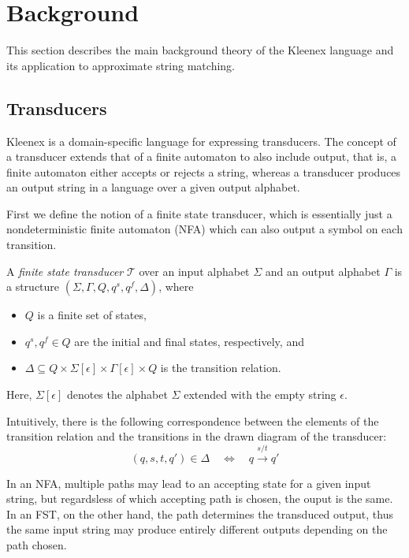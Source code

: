 \section{Background}

This section describes the main background theory of the Kleenex language and
its application to approximate string matching.

\subsection{Transducers}

Kleenex is a domain-specific language for expressing transducers. The concept
of a transducer extends that of a finite automaton to also include output, that
is, a finite automaton either accepts or rejects a string, whereas a transducer
produces an output string in a language over a given output alphabet.

First we define the notion of a finite state transducer, which is essentially
just a nondeterministic finite automaton (NFA) which can also output a symbol
on each transition.

\begin{definition}[FST]
  A \emph{finite state transducer} $\mathcal{T}$ over an input alphabet
  $\Sigma$ and an output alphabet $\Gamma$ is a structure
  $(\Sigma, \Gamma, Q, q^s, q^f, \Delta)$, where
  \begin{itemize}
      \item $Q$ is a finite set of states,
      \item $q^s, q^f \in Q$ are the initial and final states,
        respectively, and
      \item $\Delta \subseteq Q \times \Sigma[\epsilon] \times
        \Gamma[\epsilon] \times Q$ is the transition relation.
  \end{itemize}
\end{definition}

Here, $\Sigma[\epsilon]$ denotes the alphabet $\Sigma$ extended with the empty
string $\epsilon$.

Intuitively, there is the following correspondence between the elements of the
transition relation and the transitions in the drawn diagram of the transducer:
\[
  (q, s, t, q') \in \Delta \quad \Leftrightarrow \quad q \xrightarrow{s/t} q'
\]

In an NFA, multiple paths may lead to an accepting state for a given input
string, but regardsless of which accepting path is chosen, the ouput is the
same. In an FST, on the other hand, the path determines the transduced output,
thus the same input string may produce entirely different outputs depending on
the path chosen.

